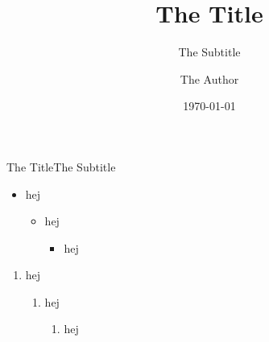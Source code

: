 \documentclass[9pt]{beamer}
\title{The Title}
\subtitle{The Subtitle}
\date{\today}
\author{The Author}
\begin{document}
    \begin{frame}
        \titlepage
    \end{frame}

    \begin{frame}{The Title}{The Subtitle}
        \begin{itemize}
            \item hej
            \begin{itemize}
                \item hej 
                \begin{itemize}
                    \item hej 
                \end{itemize}
            \end{itemize}
        \end{itemize}

        \begin{enumerate}
            \item hej
            \begin{enumerate}
                \item hej 
                \begin{enumerate}
                    \item hej 
                \end{enumerate}
            \end{enumerate}
        \end{enumerate}
    \end{frame}
\end{document}
